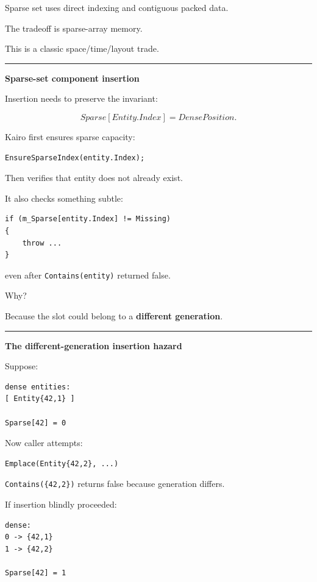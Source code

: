 Sparse set uses direct indexing and contiguous packed data.

The tradeoff is sparse-array memory.

This is a classic space/time/layout trade.

\begin{center}\rule{0.5\linewidth}{0.5pt}\end{center}

\textbf{Sparse-set component insertion}

Insertion needs to preserve the invariant:

\[
Sparse[Entity.Index]=DensePosition.
\]

Kairo first ensures sparse capacity:

\begin{verbatim}
EnsureSparseIndex(entity.Index);
\end{verbatim}

Then verifies that entity does not already exist.

It also checks something subtle:

\begin{verbatim}
if (m_Sparse[entity.Index] != Missing)
{
    throw ...
}
\end{verbatim}

even after \texttt{Contains(entity)} returned false.

Why?

Because the slot could belong to a \textbf{different generation}.

\begin{center}\rule{0.5\linewidth}{0.5pt}\end{center}

\textbf{The different-generation insertion hazard}

Suppose:

\begin{verbatim}
dense entities:
[ Entity{42,1} ]

Sparse[42] = 0
\end{verbatim}

Now caller attempts:

\begin{verbatim}
Emplace(Entity{42,2}, ...)
\end{verbatim}

\texttt{Contains(\{42,2\})} returns false because generation differs.

If insertion blindly proceeded:

\begin{verbatim}
dense:
0 -> {42,1}
1 -> {42,2}

Sparse[42] = 1
\end{verbatim}

